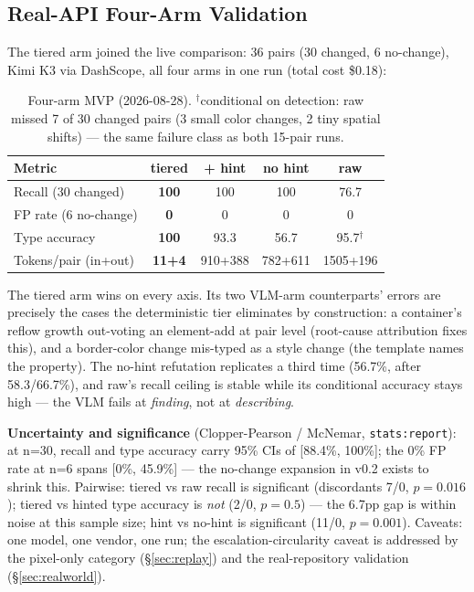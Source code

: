 \documentclass[10pt,twocolumn,letterpaper]{article}
\begin{document}
\subsection{Real-API Four-Arm Validation}

The tiered arm joined the live comparison: 36 pairs (30 changed, 6 no-change), Kimi K3 via DashScope, all four arms in one run (total cost \$0.18):

\begin{table}[h]
\centering
\small
\begin{tabular}{lcccc}
\toprule
\textbf{Metric} & \textbf{tiered} & \textbf{+ hint} & \textbf{no hint} & \textbf{raw} \\
\midrule
Recall (30 changed) & \textbf{100} & 100 & 100 & 76.7 \\
FP rate (6 no-change) & \textbf{0} & 0 & 0 & 0 \\
Type accuracy & \textbf{100} & 93.3 & 56.7 & 95.7$^{\dagger}$ \\
Tokens/pair (in+out) & \textbf{11+4} & 910+388 & 782+611 & 1505+196 \\
\bottomrule
\end{tabular}
\caption{Four-arm MVP (2026-08-28). $^{\dagger}$conditional on detection: raw missed 7 of 30 changed pairs (3 small color changes, 2 tiny spatial shifts) — the same failure class as both 15-pair runs.}
\label{tab:fourarm}
\end{table}

The tiered arm wins on every axis. Its two VLM-arm counterparts' errors are precisely the cases the deterministic tier eliminates by construction: a container's reflow growth out-voting an element-add at pair level (root-cause attribution fixes this), and a border-color change mis-typed as a style change (the template names the property). The no-hint refutation replicates a third time (56.7\%, after 58.3/66.7\%), and raw's recall ceiling is stable while its conditional accuracy stays high — the VLM fails at \textit{finding}, not at \textit{describing}.

\textbf{Uncertainty and significance} (Clopper-Pearson / McNemar, \texttt{stats:report}): at n=30, recall and type accuracy carry 95\% CIs of [88.4\%, 100\%]; the 0\% FP rate at n=6 spans [0\%, 45.9\%] — the no-change expansion in v0.2 exists to shrink this. Pairwise: tiered vs raw recall is significant (discordants 7/0, $p=0.016$); tiered vs hinted type accuracy is \textit{not} (2/0, $p=0.5$) — the 6.7pp gap is within noise at this sample size; hint vs no-hint is significant (11/0, $p=0.001$). Caveats: one model, one vendor, one run; the escalation-circularity caveat is addressed by the pixel-only category (\S\ref{sec:replay}) and the real-repository validation (\S\ref{sec:realworld}).
\end{document}
